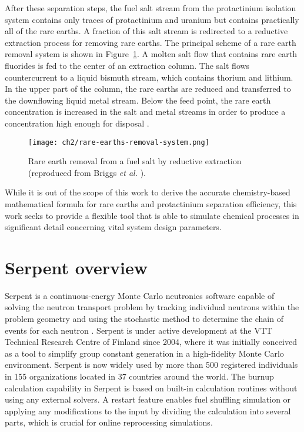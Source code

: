 After these separation steps, the fuel salt stream from the protactinium 
isolation system contains only traces of protactinium and uranium but contains 
practically all of the rare earths. A fraction of this salt stream is 
redirected to a reductive extraction process for removing rare earths.  The 
principal scheme of a rare earth removal system is shown in  
Figure~\ref{fig:rare-earth-removal}. A molten salt flow that contains 
rare earth fluorides is fed to the center of an extraction column. The salt 
flows countercurrent to a liquid bismuth stream, which contains thorium and 
lithium. In the upper part of the column, the rare earths are reduced and 
transferred to the downflowing liquid metal stream. Below the feed point, the 
rare earth concentration is increased in the salt and metal streams in order 
to produce a concentration high enough for disposal 
\cite{briggs_molten-salt_1969}.
\begin{figure}[htbp!]
	\centering
	\texttt{[image: ch2/rare-earths-removal-system.png]}
	\caption{Rare earth removal from a fuel salt by reductive extraction 
		(reproduced from Briggs \emph{et al.} 		
		\cite{briggs_molten-salt_1969}).}
	\label{fig:rare-earth-removal}
\end{figure}

While it is out of the scope of this work to derive the accurate  
chemistry-based mathematical formula for rare earths and protactinium 
separation efficiency, this work seeks to provide a flexible tool that is able 
to simulate chemical processes in significant detail concerning vital system 
design parameters.

\section{Serpent overview}
Serpent is a continuous-energy Monte Carlo neutronics software capable of 
solving the neutron transport problem by tracking individual neutrons within 
the problem geometry and using the stochastic method to determine the chain of 
events for each neutron \cite{leppanen_serpent_2014}. Serpent is under active 
development at the VTT Technical Research Centre of Finland since 2004, where 
it was initially conceived as a tool to simplify group constant generation in 
a high-fidelity Monte Carlo environment. Serpent is now widely used by more 
than 500 registered individuals in 155 organizations located in 37 countries 
around the world. The burnup calculation capability in Serpent is based on 
built-in calculation routines without using any external solvers. A restart 
feature enables fuel shuffling simulation or applying any modifications to the 
input by dividing the calculation into several parts, which is crucial for 
online reprocessing simulations.

